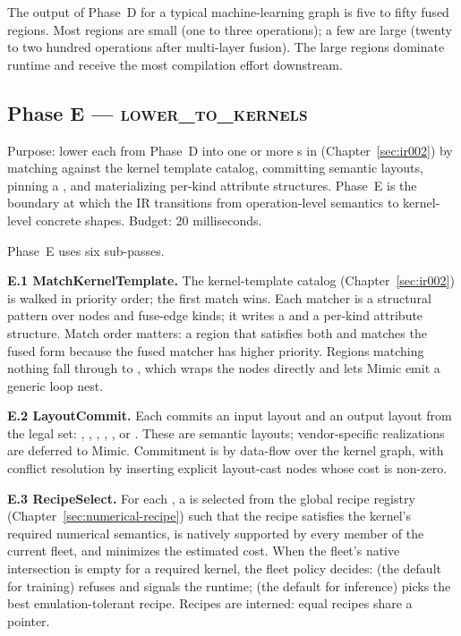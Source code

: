 The output of Phase~D for a typical machine-learning graph is five to fifty fused regions.
Most regions are small (one to three operations); a few are large (twenty to two hundred operations after multi-layer fusion).
The large regions dominate runtime and receive the most compilation effort downstream.

\subsection{Phase E --- \textsc{lower\_to\_kernels}}
\label{sec:forge-phase-e}

Purpose: lower each  from Phase~D into one or more s in  (Chapter~\ref{sec:ir002}) by matching against the kernel template catalog, committing semantic layouts, pinning a , and materializing per-kind attribute structures.
Phase~E is the boundary at which the IR transitions from operation-level semantics to kernel-level concrete shapes.
Budget: 20 milliseconds.

Phase~E uses six sub-passes.

\textbf{E.1 MatchKernelTemplate.}
The kernel-template catalog (Chapter~\ref{sec:ir002}) is walked in priority order; the first match wins.
Each matcher is a structural pattern over  nodes and fuse-edge kinds; it writes a  and a per-kind attribute structure.
Match order matters: a region that satisfies both  and  matches the fused form because the fused matcher has higher priority.
Regions matching nothing fall through to , which wraps the  nodes directly and lets Mimic emit a generic loop nest.

\textbf{E.2 LayoutCommit.}
Each  commits an input layout and an output layout from the legal set: , , , , , or .
These are semantic layouts; vendor-specific realizations are deferred to Mimic.
Commitment is by data-flow over the kernel graph, with conflict resolution by inserting explicit layout-cast nodes whose cost is non-zero.

\textbf{E.3 RecipeSelect.}
For each , a  is selected from the global recipe registry (Chapter~\ref{sec:numerical-recipe}) such that the recipe satisfies the kernel's required numerical semantics, is natively supported by every member of the current fleet, and minimizes the estimated cost.
When the fleet's native intersection is empty for a required kernel, the fleet policy decides:  (the default for training) refuses and signals the runtime;  (the default for inference) picks the best emulation-tolerant recipe.
Recipes are interned: equal recipes share a pointer.

